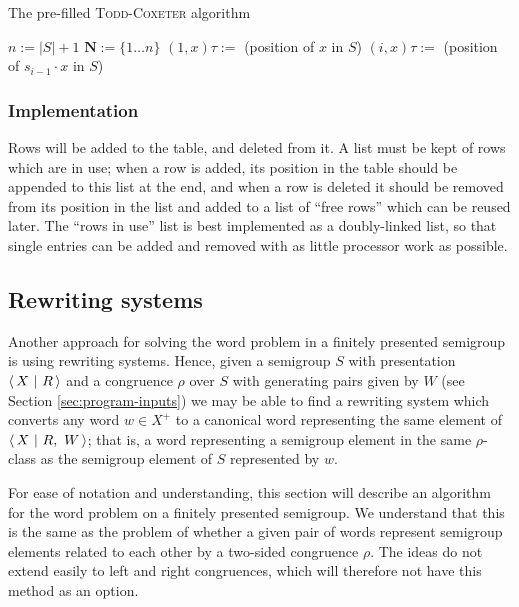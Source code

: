 \begin{algorithm}
\caption{The pre-filled \textsc{Todd-Coxeter} algorithm}
\label{alg:tc-prefill}
\begin{algorithmic}[1]
\State $n := |S| + 1$
\State $\mathbf{N} := \{1 \ldots n\}$
  \State $(1, x)\tau :=$ (position of $x$ in $S$)
    \State $(i, x)\tau :=$ (position of $s_{i-1} \cdot x$ in $S$)
  \EndFor
\EndFor
{}
    \State {}
  \EndFor
\EndFor
\EndProcedure
\end{algorithmic}
\end{algorithm}

\subsubsection{Implementation}

Rows will be added to the table, and deleted from it.  A list must be kept of
rows which are in use; when a row is added, its position in the table should be
appended to this list at the end, and when a row is deleted it should be removed
from its position in the list and added to a list of ``free rows'' which can be
reused later.  The ``rows in use'' list is best implemented as a doubly-linked
list, so that single entries can be added and removed with as little processor
work as possible.

\subsection{Rewriting systems}
\label{sec:kb}

Another approach for solving the word problem in a finitely presented semigroup
is using rewriting systems.  Hence, given a semigroup $S$ with presentation
$\left\langle\,X ~\middle|~ R\,\right\rangle$ and a congruence $\rho$ over $S$ with generating pairs given by $W$
(see Section \ref{sec:program-inputs})
we may be able to find a rewriting system which converts any word $w \in X^+$ to
a canonical word representing the same element of $\left\langle\,X ~\middle|~ R,\ W\,\right\rangle$;
that is, a word representing a semigroup element in the same $\rho$-class as
the semigroup element of $S$ represented by $w$.

For ease of notation and understanding, this section will describe an algorithm
for the word problem on a finitely presented semigroup.  We understand that this
is the same as the problem of whether a given pair of words represent semigroup
elements related to each other by a two-sided congruence $\rho$.  The ideas do
not extend easily to left and right congruences, which will therefore not have
this method as an option.

